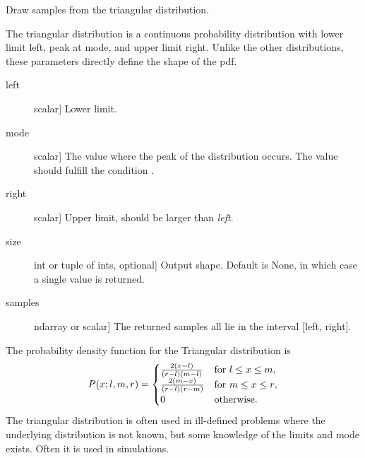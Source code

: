\documentclass[letterpaper,10pt,english]{sphinxmanual}
\begin{document}

\begin{fulllineitems}
\label{pygeomod:pygeomod.geomodeller_xml_obj.triangular}
Draw samples from the triangular distribution.

The triangular distribution is a continuous probability distribution with
lower limit left, peak at mode, and upper limit right. Unlike the other
distributions, these parameters directly define the shape of the pdf.
\begin{description}
\item[{left}] \leavevmode{[}scalar{]}
Lower limit.

\item[{mode}] \leavevmode{[}scalar{]}
The value where the peak of the distribution occurs.
The value should fulfill the condition .

\item[{right}] \leavevmode{[}scalar{]}
Upper limit, should be larger than \emph{left}.

\item[{size}] \leavevmode{[}int or tuple of ints, optional{]}
Output shape. Default is None, in which case a single value is
returned.

\end{description}
\begin{description}
\item[{samples}] \leavevmode{[}ndarray or scalar{]}
The returned samples all lie in the interval {[}left, right{]}.

\end{description}

The probability density function for the Triangular distribution is
\begin{gather}
\begin{split}P(x;l, m, r) = \begin{cases}
\frac{2(x-l)}{(r-l)(m-l)}& \text{for $l \leq x \leq m$},\\
\frac{2(m-x)}{(r-l)(r-m)}& \text{for $m \leq x \leq r$},\\
0& \text{otherwise}.
\end{cases}\end{split}\notag
\end{gather}
The triangular distribution is often used in ill-defined problems where the
underlying distribution is not known, but some knowledge of the limits and
mode exists. Often it is used in simulations.


\end{fulllineitems}
\end{document}
